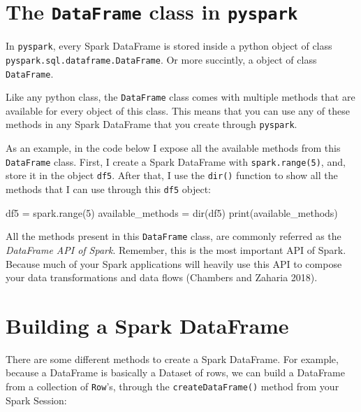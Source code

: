 \documentclass[
  11pt,
  letterpaper,
  DIV=11,
  numbers=noendperiod]{scrreprt}
\newenvironment{Shaded}{\begin{snugshade}}{\end{snugshade}}
\newcommand{\BuiltInTok}[1]{\textcolor[rgb]{0.00,0.23,0.31}{#1}}
\newcommand{\DecValTok}[1]{\textcolor[rgb]{0.68,0.00,0.00}{#1}}
\newcommand{\NormalTok}[1]{\textcolor[rgb]{0.00,0.23,0.31}{#1}}
\newcommand{\OperatorTok}[1]{\textcolor[rgb]{0.37,0.37,0.37}{#1}}
\begin{document}
\hypertarget{sec-dataframe-class}{%
\section{\texorpdfstring{The \texttt{DataFrame} class in
\texttt{pyspark}}{The DataFrame class in pyspark}}\label{sec-dataframe-class}}

In \texttt{pyspark}, every Spark DataFrame is stored inside a python
object of class \texttt{pyspark.sql.dataframe.DataFrame}. Or more
succintly, a object of class \texttt{DataFrame}.

Like any python class, the \texttt{DataFrame} class comes with multiple
methods that are available for every object of this class. This means
that you can use any of these methods in any Spark DataFrame that you
create through \texttt{pyspark}.

As an example, in the code below I expose all the available methods from
this \texttt{DataFrame} class. First, I create a Spark DataFrame with
\texttt{spark.range(5)}, and, store it in the object \texttt{df5}. After
that, I use the \texttt{dir()} function to show all the methods that I
can use through this \texttt{df5} object:

\begin{Shaded}
\begin{Highlighting}[]
\NormalTok{df5 }\OperatorTok{=}\NormalTok{ spark.}\BuiltInTok{range}\NormalTok{(}\DecValTok{5}\NormalTok{)}
\NormalTok{available\_methods }\OperatorTok{=} \BuiltInTok{dir}\NormalTok{(df5)}
\BuiltInTok{print}\NormalTok{(available\_methods)}
\end{Highlighting}
\end{Shaded}

All the methods present in this \texttt{DataFrame} class, are commonly
referred as the \emph{DataFrame API of Spark}. Remember, this is the
most important API of Spark. Because much of your Spark applications
will heavily use this API to compose your data transformations and data
flows (Chambers and Zaharia 2018).

\hypertarget{sec-building-a-dataframe}{%
\section{Building a Spark DataFrame}\label{sec-building-a-dataframe}}

There are some different methods to create a Spark DataFrame. For
example, because a DataFrame is basically a Dataset of rows, we can
build a DataFrame from a collection of \texttt{Row}'s, through the
\texttt{createDataFrame()} method from your Spark Session:
\end{document}
